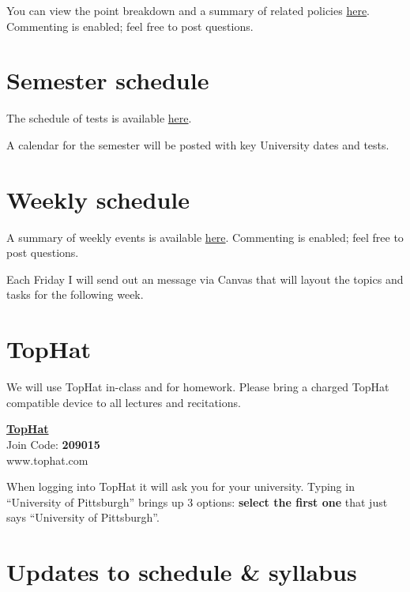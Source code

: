 \documentclass[
]{book}
\begin{document}
You can view the point breakdown and a summary of related policies \href{https://docs.google.com/spreadsheets/d/1G_-Iqg85j5HgYVSwHyutMkaZWkZzbr32we-HVjJZhdk/edit?usp=sharing}{here}. Commenting is enabled; feel free to post questions.

\hypertarget{semester-schedule}{%
\chapter{Semester schedule}\label{semester-schedule}}

The schedule of tests is available \href{https://docs.google.com/spreadsheets/d/1Zsqfqako3ctJByqRzbU2bTcv7fCXCKLHp_RDfzd-Qmg/edit?usp=sharing}{here}.

A calendar for the semester will be posted with key University dates and tests.

\hypertarget{weekly-schedule}{%
\chapter{Weekly schedule}\label{weekly-schedule}}

A summary of weekly events is available \href{https://docs.google.com/spreadsheets/d/12ryH_WBJadioURhMu9HHSO1NxyBA6f9QAuTdasXkY3Y/edit?usp=sharing}{here}. Commenting is enabled; feel free to post questions.

Each Friday I will send out an message via Canvas that will layout the topics and tasks for the following week.

\hypertarget{tophat}{%
\chapter{TopHat}\label{tophat}}

We will use TopHat in-class and for homework. Please bring a charged TopHat compatible device to all lectures and recitations.

\href{www.tophat.com}{\textbf{TopHat}}\\
Join Code: \textbf{209015}\\
www.tophat.com

When logging into TopHat it will ask you for your university. Typing in ``University of Pittsburgh'' brings up 3 options: \textbf{select the first one} that just says ``University of Pittsburgh''.

\hypertarget{updates-to-schedule-syllabus}{%
\chapter{Updates to schedule \& syllabus}\label{updates-to-schedule-syllabus}}
\end{document}

